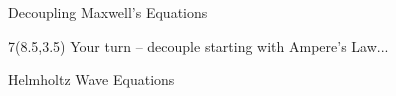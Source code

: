 \begin{lesson34}
\begin{frame}{Decoupling Maxwell's Equations}
\begin{textblock}{7}(8.5,3.5)
Your turn -- decouple starting with Ampere's Law...
\begin{myblock}[0.9]{Helmholtz Wave Equations}
\begin{small}
\end{small}
\end{myblock}

\end{textblock}

\end{frame}
\end{lesson34}
